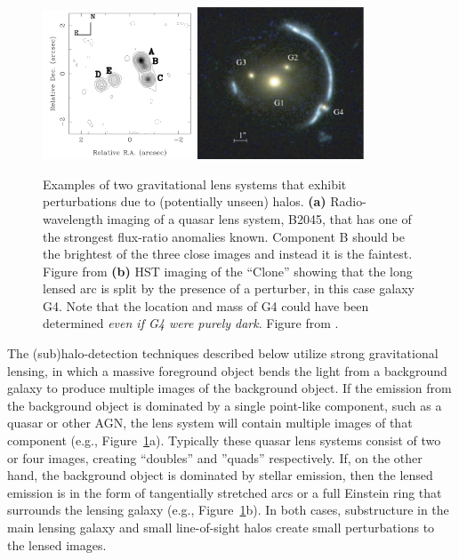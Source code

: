\documentclass[modern,linenumbers]{aastex62}
\begin{document}
\begin{figure}
    \centering
    \includegraphics[width=0.4\textwidth]{figures/2045_vla_dec96_x.png}    \includegraphics[width=0.44\textwidth]{figures/Clone_labeled.png}
    \caption{Examples of two gravitational lens systems that exhibit perturbations due to (potentially unseen) halos.  {\bf (a)} Radio-wavelength imaging of a quasar lens system, B2045, that has one of the strongest flux-ratio anomalies known.  Component B should be the brightest of the three close images and instead it is the faintest. Figure from \citet{Fassnacht++99}
    {\bf (b)} HST imaging of the ``Clone'' showing that the long lensed arc is split by the presence of a perturber, in this case galaxy G4.  Note that the location and mass of G4 could have been determined {\em even if G4 were purely dark}.  Figure from \citet{Vegetti_2010_1}.}
    \label{fig:stronglens_examples}
\end{figure}

The (sub)halo-detection techniques described below utilize strong gravitational lensing, in which a massive foreground object bends the light from a background galaxy to produce multiple images of the background object.  
If the emission from the background object is dominated by a single point-like component, such as a quasar or other AGN, the lens system will contain multiple images of that component (e.g., Figure~\ref{fig:stronglens_examples}a).
Typically these quasar lens systems consist of two or four images, creating ``doubles'' and ''quads'' respectively. 
If, on the other hand, the background object is dominated by stellar emission, then the lensed emission is in the form of tangentially stretched arcs or a full Einstein ring that surrounds the lensing galaxy (e.g., Figure~\ref{fig:stronglens_examples}b).  
In both cases, substructure in the main lensing galaxy and small line-of-sight halos create small perturbations to the lensed images.
\end{document}
